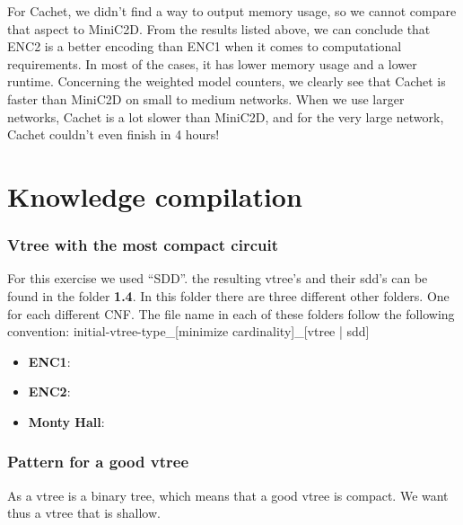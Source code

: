 For Cachet, we didn't find a way to output memory usage, so we cannot compare that aspect to MiniC2D.
From the results listed above, we can conclude that ENC2 is a better encoding than ENC1 when it comes to computational requirements. In most of the cases, it has lower memory usage and a lower runtime.
Concerning the weighted model counters, we clearly see that Cachet is faster than MiniC2D on small to medium networks. When we use larger networks, Cachet is a lot slower than MiniC2D, and for the very large network, Cachet couldn't even finish in 4 hours!

\section{Knowledge compilation}
\subsubsection{Vtree with the most compact circuit}
For this exercise we used ``SDD''. the resulting vtree's and their sdd's can be found in the folder \textbf{1.4}.
In this folder there are three different other folders. One for each different CNF.
The file name in each of these folders follow the following convention:
initial-vtree-type\_[minimize cardinality]\_[vtree | sdd]
\begin{itemize}
    \item \textbf{ENC1}:
    \item \textbf{ENC2}:
    \item \textbf{Monty Hall}:
\end{itemize}

\subsubsection{Pattern for a good vtree}
As a vtree is a binary tree, which means that a good vtree is compact. We want thus a vtree that is shallow. 
